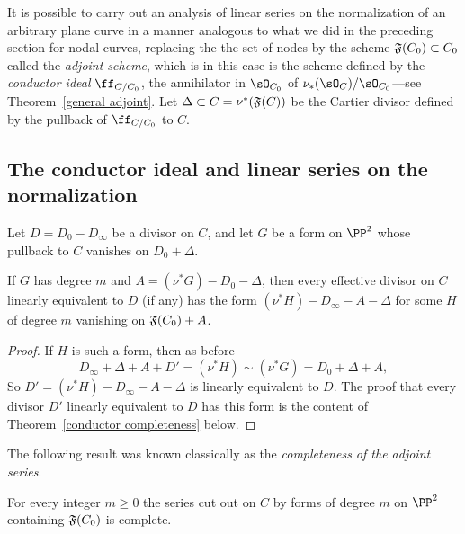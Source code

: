 It is possible to carry out an analysis of linear series on the normalization of an arbitrary plane curve in a manner  analogous to what we did in the preceding section for nodal curves, replacing the the set of nodes by the scheme $\adj(C_{0})\subset C_{0}$ called the \emph{adjoint scheme}, which is in this case is the scheme
defined by the \emph{conductor ideal} $\ff_{C/C_0}$, the annihilator in $\sO_{C_{0}}$ of $\nu_{*}(\sO_{C})/\sO_{C_{0}}$---see Theorem~\ref{general adjoint}. Let $\Delta\subset C = \nu^{*}(\adj(C))$ be the Cartier divisor
defined by the pullback of $\ff_{C/C_0}$ to $C$.

\subsection{The conductor ideal and linear series on the normalization}

\begin{theorem}\label{linear series on arbitrary curves}
Let $D = D_{0}-D_{\infty}$ be a divisor on $C$, and let $G$ be a form on $\PP^{2}$ whose pullback to $C$
vanishes on $D_{0}+\Delta$. 

If $G$ has degree $m$ and $A = (\nu^{*}G)-D_{0}-\Delta$, then every effective divisor on
$C$ linearly equivalent to $D$ (if any) has the form $(\nu^*H)-D_{\infty}-A-\Delta$ for some $H$ of degree $m$
 vanishing on $\adj(C_{0})+A$.
\end{theorem}

\begin{proof}
If $H$ is such a form, then as before
$$
 D_\infty +\Delta + A+ D' = (\nu^*H) \sim (\nu^*G) = D_0 + \Delta + A,
$$
So $D' = (\nu^*{H})-D_{\infty}-A-\Delta$ is linearly equivalent to $D$. The proof that every
divisor $D'$ linearly equivalent to $D$ has this form is the content of
Theorem~\ref{conductor completeness} below.
\end{proof}


The following result was known classically as the \emph{completeness of the adjoint series}.

\begin{theorem}\label{conductor completeness}
For every integer $m\geq 0$ the series cut out on $C$ by forms of degree $m$
on $\PP^{2}$ containing $\adj(C_{0})$ is complete.
\end{theorem}

